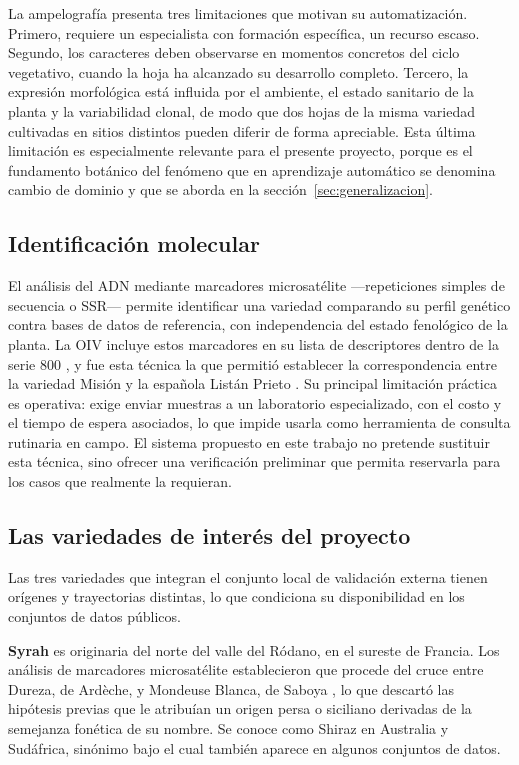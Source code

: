 La ampelografía presenta tres limitaciones que motivan su automatización.
Primero, requiere un especialista con formación específica, un recurso
escaso. Segundo, los caracteres deben observarse en momentos concretos del
ciclo vegetativo, cuando la hoja ha alcanzado su desarrollo completo.
Tercero, la expresión morfológica está influida por el ambiente, el estado
sanitario de la planta y la variabilidad clonal, de modo que dos hojas de la
misma variedad cultivadas en sitios distintos pueden diferir de forma
apreciable. Esta última limitación es especialmente relevante para el
presente proyecto, porque es el fundamento botánico del fenómeno que en
aprendizaje automático se denomina cambio de dominio y que se aborda en la
sección~\ref{sec:generalizacion}.

\subsection{Identificación molecular}

El análisis del ADN mediante marcadores microsatélite —repeticiones simples
de secuencia o SSR— permite identificar una variedad comparando su perfil
genético contra bases de datos de referencia, con independencia del estado
fenológico de la planta. La OIV incluye estos marcadores en su lista de
descriptores dentro de la serie 800 \citep{oiv2023}, y fue esta técnica la
que permitió establecer la correspondencia entre la variedad Misión y la
española Listán Prieto \citep{tapia2007}. Su principal limitación práctica
es operativa: exige enviar muestras a un laboratorio especializado, con el
costo y el tiempo de espera asociados, lo que impide usarla como
herramienta de consulta rutinaria en campo. El sistema propuesto en este
trabajo no pretende sustituir esta técnica, sino ofrecer una verificación
preliminar que permita reservarla para los casos que realmente la
requieran.

\subsection{Las variedades de interés del proyecto}
\label{sec:variedades}

Las tres variedades que integran el conjunto local de validación externa
tienen orígenes y trayectorias distintas, lo que condiciona su
disponibilidad en los conjuntos de datos públicos.

\textbf{Syrah} es originaria del norte del valle del Ródano, en el sureste
de Francia. Los análisis de marcadores microsatélite establecieron que
procede del cruce entre Dureza, de Ardèche, y Mondeuse Blanca, de Saboya
\citep{vouillamoz2006}, lo que descartó las hipótesis previas que le
atribuían un origen persa o siciliano derivadas de la semejanza fonética de
su nombre. Se conoce como Shiraz en Australia y Sudáfrica, sinónimo bajo el
cual también aparece en algunos conjuntos de datos.

